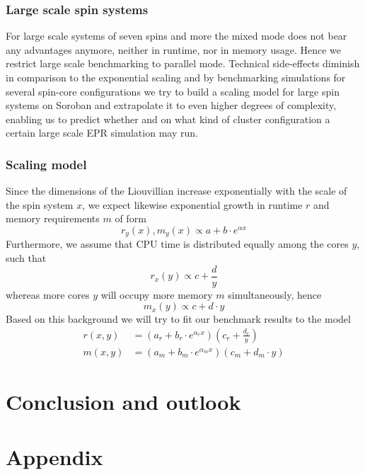 \documentclass[11.5pt,a4paper]{article}
\begin{document}
\subsubsection{Large scale spin systems}
For large scale systems of seven spins and more the mixed mode does not bear any advantages anymore, neither in runtime, nor in memory usage. Hence we restrict large scale benchmarking to parallel mode. Technical side-effects diminish in comparison to the exponential scaling and by benchmarking simulations for several spin-core configurations we try to build a scaling model for large spin systems on Soroban and extrapolate it to even higher degrees of complexity, enabling us to predict whether and on what kind of cluster configuration a certain large scale EPR simulation may run. 

\subsubsection{Scaling model}
Since the dimensions of the Liouvillian increase exponentially with the scale of the spin system $x$, we expect likewise exponential growth in runtime $r$ and memory requirements $m$ of form
\begin{equation}
 r_y(x), m_y(x) \propto a + b \cdot e^{\alpha x}
\end{equation}
Furthermore, we assume that CPU time is distributed equally among the cores $y$, such that
\begin{equation}
 r_x(y) \propto c + \frac{d}{y}
\end{equation}
whereas more cores $y$ will occupy more memory $m$ simultaneously, hence
\begin{equation}
 m_x(y) \propto c + d \cdot y
\end{equation}
Based on this background we will try to fit our benchmark results to the model
\begin{align}
 r(x,y)  & = \left( a_r + b_r \cdot e^{\alpha_r x} \right) \left(c_r + \frac{d_r}{y} \right) \\
 m(x,y)  & = \left( a_m + b_m \cdot e^{\alpha_m x} \right) \left(c_m + d_m \cdot y\right)
\end{align}




\section{Conclusion and outlook}

\section{Appendix}
\end{document}

